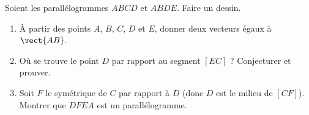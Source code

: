 
\begin{exercice}\label{exosmath-0106}

        Soient les parallélogrammes \( ABCD\) et \( ABDE\). Faire un dessin.
        \begin{enumerate}
            \item
                À partir des points \( A\), \( B\), \( C\), \( D\) et \( E\), donner deux vecteurs égaux à \( \vect{ AB }\).
            \item
                Où se trouve le point \( D\) par rapport au segment \( [EC]\) ? Conjecturer et prouver.
            \item
                Soit \( F\) le symétrique de \( C\) par rapport à \( D\) (donc \( D\) est le milieu de \( [CF]\)). Montrer que \( DFEA\) est un parallélogramme.
        \end{enumerate}

\end{exercice}
